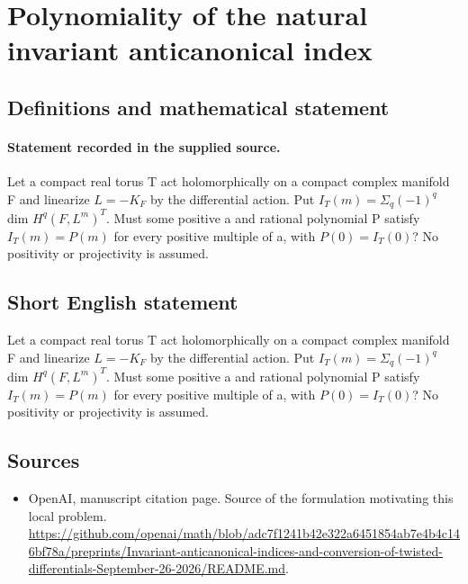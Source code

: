 \documentclass[11pt]{article}
\begin{document}
\section*{Polynomiality of the natural invariant anticanonical index}\label{statement}
\subsection{Definitions and mathematical statement}
\paragraph{Statement recorded in the supplied source.}
Let a compact real torus T act holomorphically on a compact complex manifold F and linearize $L=-K_F$ by the differential action. Put $I_T(m)=\Sigma _q(-1)^q$ dim $H^q(F,L^m)^T$. Must some positive a and rational polynomial P satisfy $I_T(m)=P(m)$ for every positive multiple of a, with $P(0)=I_T(0)$? No positivity or projectivity is assumed.
\subsection{Short English statement}
Let a compact real torus T act holomorphically on a compact complex manifold F and linearize $L=-K_F$ by the differential action. Put $I_T(m)=\Sigma _q(-1)^q$ dim $H^q(F,L^m)^T$. Must some positive a and rational polynomial P satisfy $I_T(m)=P(m)$ for every positive multiple of a, with $P(0)=I_T(0)$? No positivity or projectivity is assumed.
\subsection{Sources}
\begin{itemize}
\item[S1] OpenAI, manuscript citation page. Source of the formulation motivating this local problem.
\url{https://github.com/openai/math/blob/adc7f1241b42e322a6451854ab7e4b4c146bf78a/preprints/Invariant-anticanonical-indices-and-conversion-of-twisted-differentials-September-26-2026/README.md}.
\end{itemize}
\end{document}
